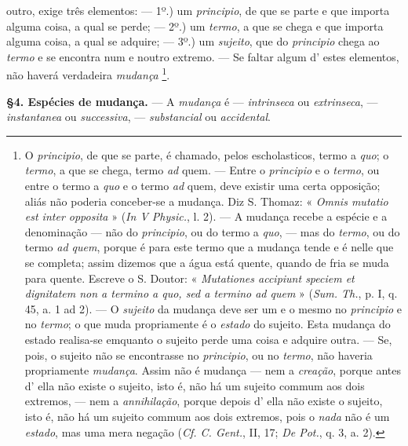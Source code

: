  outro, exige três elementos: --- 1º.) um \emph{principio}, de que se parte e que importa alguma coisa, a qual se perde; --- 2º.) um \emph{termo}, a que se chega e que importa alguma coisa, a qual se adquire; --- 3º.) um \emph{sujeito}, que do \emph{principio} chega ao \emph{termo} e se encontra num e noutro extremo. --- Se faltar algum d' estes elementos, não haverá verdadeira \emph{mudança} \footnote{O \emph{principio}, de que se parte, é chamado, pelos escholasticos, termo a \emph{quo}; o \emph{termo}, a que se chega, termo \emph{ad} quem. --- Entre o \emph{principio} e o \emph{termo}, ou entre o termo a \emph{quo} e o termo \emph{ad} quem, deve existir uma certa opposição; aliás não poderia conceber-se a mudança. Diz S. Thomaz: « \emph{Omnis mutatio est inter opposita} » (\emph{In V Physic.}, l. 2). --- A mudança recebe a espécie e a denominação --- não do \emph{principio}, ou do termo a \emph{quo}, --- mas do \emph{termo}, ou do termo \emph{ad quem}, porque é para este termo que a mudança tende e é nelle que se completa; assim dizemos que a água está quente, quando de fria se muda para quente. Escreve o S. Doutor: « \emph{Mutationes accipiunt speciem et dignitatem non a termino a quo, sed a termino ad quem} » (\emph{Sum. Th.}, p. I, q. 45, a. 1 ad 2). --- O \emph{sujeito} da mudança deve ser um e o mesmo no \emph{principio} e no \emph{termo}; o que muda propriamente é o \emph{estado} do sujeito. Esta mudança do estado realisa-se emquanto o sujeito perde uma coisa e adquire outra. --- Se, pois, o sujeito não se encontrasse no \emph{principio}, ou no \emph{termo}, não haveria propriamente \emph{mudança}. Assim não é mudança --- nem a \emph{creação}, porque antes d' ella não existe o sujeito, isto é, não há um sujeito commum aos dois extremos, --- nem a \emph{annihilação}, porque depois d' ella não existe o sujeito, isto é, não há um sujeito commum aos dois extremos, pois o \emph{nada} não é um \emph{estado}, mas uma mera negação (\emph{Cf. C. Gent.}, II, 17; \emph{De Pot.}, q. 3, a. 2).}.

\textbf{§4. Espécies de mudança.} --- A \emph{mudança} é --- \emph{intrinseca} ou \emph{extrinseca}, --- \emph{instantanea} ou \emph{successiva}, --- \emph{substancial} ou \emph{accidental}.


